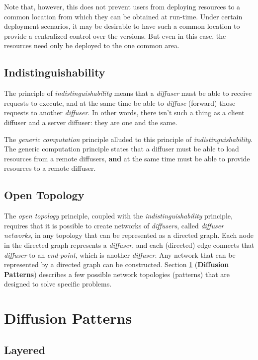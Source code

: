 \documentclass[11pt]{amsart}
\begin{document}
Note that, however, this does not prevent users from deploying resources to a common location from which they can be obtained at run-time. Under certain deployment scenarios, it may be desirable to have such a common location to provide a centralized control over the versions. But even in this case, the resources need only be deployed to the one common area.

\subsection{Indistinguishability}
The principle of \emph{indistinguishability} means that a \emph{diffuser} must be able to receive requests to execute, and at the same time be able to \emph{diffuse} (forward) those requests to another \emph{diffuser}. In other words, there isn't such a thing as a client diffuser and a server diffuser: they are one and the same.

The \emph{generic computation} principle alluded to this principle of \emph{indistinguishability}. The generic computation principle states that a diffuser must be able to load resources from a remote diffusers, \textbf{and} at the same time must be able to provide resources to a remote diffuser.

\subsection{Open Topology}
The \emph{open topology} principle, coupled with the \emph{indistinguishability} principle, requires that it is possible to create networks of \emph{diffusers}, called \emph{diffuser networks}, in any topology that can be represented as a directed graph. Each node in the directed graph represents a \emph{diffuser}, and each (directed) edge connects that \emph{diffuser} to an \emph{end-point}, which is another \emph{diffuser}. Any network that can be represented by a directed graph can be constructed. Section \ref{sec:diffusion_patterns} (\textbf{Diffusion Patterns}) describes a few possible network topologies (patterns) that are designed to solve specific problems.

%
%
\section{Diffusion Patterns}\label{sec:diffusion_patterns}

\subsection{Layered}
\end{document}
